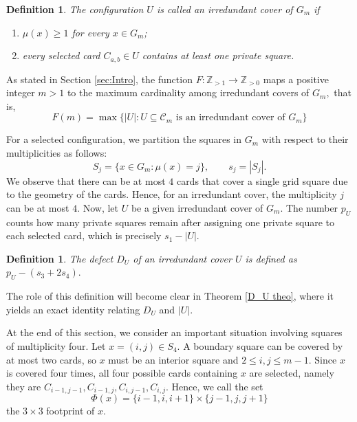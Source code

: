 \documentclass[11pt]{article}
\newtheorem{definition}[theorem]{Definition}
\begin{document}
	\begin{definition}
		The configuration \(U\) is called  an irredundant cover of \(G_m\) if
		\begin{enumerate}[label=(\roman*)]
			\item \(\mu(x)\ge1\) for every \(x\in G_m\);
			\item every selected card \(C_{a,b}\in U\) contains at least one private square.
		\end{enumerate}
	\end{definition}
	
	As stated in Section \ref{sec:Intro}, the function $F:\mathbb{Z}_{>1} \rightarrow \mathbb{Z}_{>0}$ maps a positive integer $m>1$ to the maximum cardinality among irredundant covers of $G_m,$ that is,
	\[
	F(m)=\max\{|U|: U\subseteq\mathcal C_m \text{ is an irredundant cover of }G_m\}
	\]
	
	For a selected configuration, we partition the squares in $G_m$ with respect to their multiplicities as follows:
	\[
	S_j=\{x\in G_m:\mu(x)=j\},
	\qquad
	s_j=|S_j|.
	\]
	We observe that there can be at most $4$ cards that cover a single grid square due to the geometry of the cards. Hence, for an irredundant cover, the multiplicity $j$ can be at most $4$. Now, let $U$ be a given irredundant cover of $G_m$. The number $p_U$ counts how many private squares remain after assigning
	one private square to each selected card, which is precisely $s_1-|U|.$ 
	
	
	\begin{definition}
		The defect $D_U$ of an irredundant cover $U$ is defined as \( p_U-(s_3+2s_4). \)
	\end{definition}
	The role of this definition will become clear in Theorem \ref{D_U theo}, where it yields an exact identity relating \(D_U\) and \(|U|\).
	
	
	At the end of this section, we consider an important situation involving squares of multiplicity four. Let \(x=(i,j)\in S_4\).  A boundary square can be covered by at most two cards, so \(x\) must be an interior square and \(2\le i,j\le m-1\).  Since  $x$ is covered four times, all four possible cards containing \(x\) are selected, namely they are  \(C_{i-1,j-1}, C_{i-1,j}, C_{i,j-1}, C_{i,j}.\) Hence, we call the set
	\[
	\Phi(x)=\{i-1,i,i+1\}\times\{j-1,j,j+1\}
	\]
	the \(3\times3\) footprint of \(x\).
	
\end{document}
